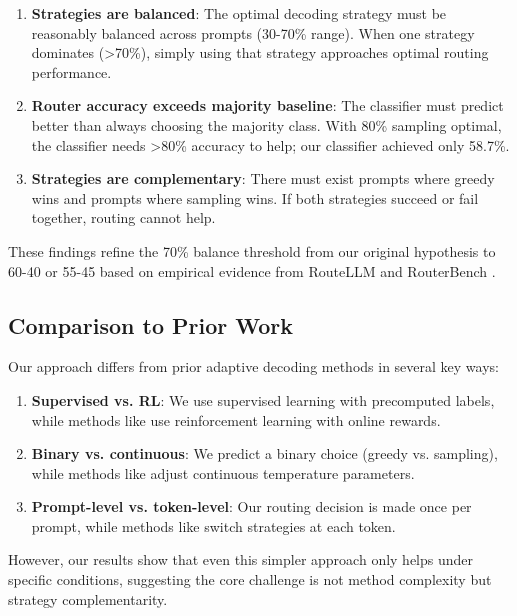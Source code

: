 \documentclass[11pt,letterpaper]{article}
\begin{document}
\begin{enumerate}
    \item \textbf{Strategies are balanced}: The optimal decoding strategy must be reasonably balanced across prompts (30-70\% range). When one strategy dominates (>70\%), simply using that strategy approaches optimal routing performance.
    
    \item \textbf{Router accuracy exceeds majority baseline}: The classifier must predict better than always choosing the majority class. With 80\% sampling optimal, the classifier needs >80\% accuracy to help; our classifier achieved only 58.7\%.
    
    \item \textbf{Strategies are complementary}: There must exist prompts where greedy wins and prompts where sampling wins. If both strategies succeed or fail together, routing cannot help.
\end{enumerate}

These findings refine the 70\% balance threshold from our original hypothesis to 60-40 or 55-45 based on empirical evidence from RouteLLM and RouterBench \cite{Ong2024, Hu2024}.

\subsection{Comparison to Prior Work}

Our approach differs from prior adaptive decoding methods in several key ways:

\begin{enumerate}
    \item \textbf{Supervised vs. RL}: We use supervised learning with precomputed labels, while methods like \cite{Zhang2026} use reinforcement learning with online rewards.
    \item \textbf{Binary vs. continuous}: We predict a binary choice (greedy vs. sampling), while methods like \cite{Dhuliawala2024} adjust continuous temperature parameters.
    \item \textbf{Prompt-level vs. token-level}: Our routing decision is made once per prompt, while methods like \cite{Chakraborty2025} switch strategies at each token.
\end{enumerate}

However, our results show that even this simpler approach only helps under specific conditions, suggesting the core challenge is not method complexity but strategy complementarity.
\end{document}
